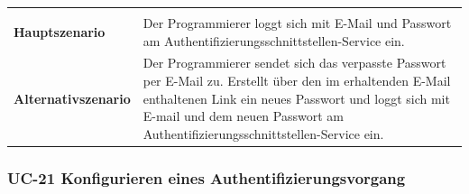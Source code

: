 \begin{longtable}[c]{@{}ll@{}}
\begin{minipage}[t]{0.60\columnwidth}
\strut\end{minipage}\tabularnewline
\begin{minipage}[t]{0.34\columnwidth}\raggedright\strut
\textbf{Hauptszenario}
\strut\end{minipage} &
\begin{minipage}[t]{0.60\columnwidth}\raggedright\strut
Der Programmierer loggt sich mit E-Mail und Passwort am
Authentifizierungsschnittstellen-Service ein.
\strut\end{minipage}\tabularnewline
\begin{minipage}[t]{0.34\columnwidth}\raggedright\strut
\textbf{Alternativszenario}
\strut\end{minipage} &
\begin{minipage}[t]{0.60\columnwidth}\raggedright\strut
Der Programmierer sendet sich das verpasste Passwort per E-Mail zu.
Erstellt über den im erhaltenden E-Mail enthaltenen Link ein neues
Passwort und loggt sich mit E-mail und dem neuen Passwort am
Authentifizierungsschnittstellen-Service ein.
\strut\end{minipage}\tabularnewline
\bottomrule
\end{longtable}

\subsubsection{UC-21 Konfigurieren eines
Authentifizierungsvorgang}\label{uc-21-konfigurieren-eines-authentifizierungsvorgang}

